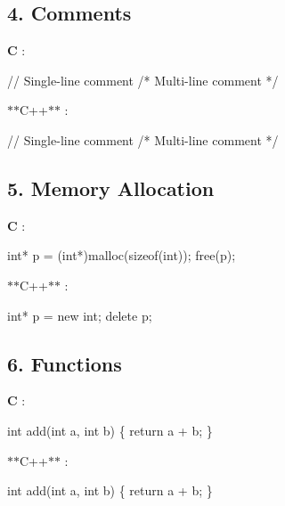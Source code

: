 \subsection*{4. Comments}


\begin{DoxyItemize}
\item {\bfseries C} \+: 
\begin{DoxyCode}
\textcolor{comment}{// Single-line comment}
\textcolor{comment}{/* Multi-line}
\textcolor{comment}{   comment */}
\end{DoxyCode}

\item $\ast$$\ast$\+C++$\ast$$\ast$ \+: 
\begin{DoxyCode}
\textcolor{comment}{// Single-line comment}
\textcolor{comment}{/* Multi-line}
\textcolor{comment}{   comment */}
\end{DoxyCode}

\end{DoxyItemize}

\subsection*{5. Memory Allocation}


\begin{DoxyItemize}
\item {\bfseries C} \+: 
\begin{DoxyCode}
\textcolor{keywordtype}{int}* p = (\textcolor{keywordtype}{int}*)malloc(\textcolor{keyword}{sizeof}(\textcolor{keywordtype}{int}));
free(p);
\end{DoxyCode}

\item $\ast$$\ast$\+C++$\ast$$\ast$ \+: 
\begin{DoxyCode}
\textcolor{keywordtype}{int}* p = \textcolor{keyword}{new} int;
\textcolor{keyword}{delete} p;
\end{DoxyCode}

\end{DoxyItemize}

\subsection*{6. Functions}


\begin{DoxyItemize}
\item {\bfseries C} \+: 
\begin{DoxyCode}
\textcolor{keywordtype}{int} add(\textcolor{keywordtype}{int} a, \textcolor{keywordtype}{int} b) \{
    \textcolor{keywordflow}{return} a + b;
\}
\end{DoxyCode}

\item $\ast$$\ast$\+C++$\ast$$\ast$ \+: 
\begin{DoxyCode}
\textcolor{keywordtype}{int} add(\textcolor{keywordtype}{int} a, \textcolor{keywordtype}{int} b) \{
    \textcolor{keywordflow}{return} a + b;
\}
\end{DoxyCode}

\end{DoxyItemize}

